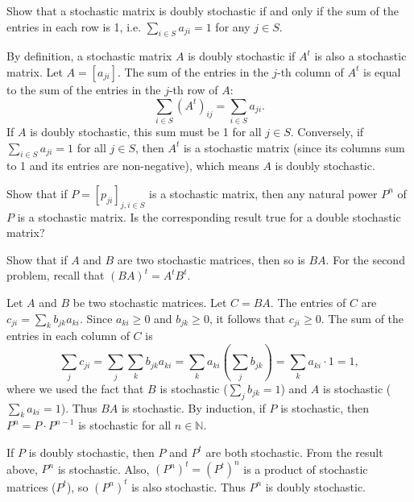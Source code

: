 \begin{Proposition}
\label{prp:double-stochastic}
Show that a stochastic matrix is doubly stochastic if and only if the sum of the entries in each row is 1, i.e. $\sum_{i\in S} a_{ji} = 1$ for any $j\in S$.
\end{Proposition}

\begin{Solution}
By definition, a stochastic matrix $A$ is doubly stochastic if $A^t$ is also a stochastic matrix. Let $A = [a_{ji}]$. The sum of the entries in the $j$-th column of $A^t$ is equal to the sum of the entries in the $j$-th row of $A$:
\[
\sum_{i \in S} (A^t)_{ij} = \sum_{i \in S} a_{ji}.
\]
If $A$ is doubly stochastic, this sum must be 1 for all $j \in S$. Conversely, if $\sum_{i \in S} a_{ji} = 1$ for all $j \in S$, then $A^t$ is a stochastic matrix (since its columns sum to 1 and its entries are non-negative), which means $A$ is doubly stochastic.
\end{Solution}

\begin{Exercise}
\label{exr:power-of-stochastic}
Show that if $P = [p_{ji}]_{j,i\in S}$ is a stochastic matrix, then any natural power $P^n$ of $P$ is a stochastic matrix. Is the corresponding result true for a double stochastic matrix?

\begin{hint}
Show that if $A$ and $B$ are two stochastic matrices, then so is $BA$. For the second problem, recall that $(BA)^t = A^t B^t$.
\end{hint}
\end{Exercise}

\begin{Solution}
Let $A$ and $B$ be two stochastic matrices. Let $C = BA$. The entries of $C$ are $c_{ji} = \sum_k b_{jk} a_{ki}$. Since $a_{ki} \geq 0$ and $b_{jk} \geq 0$, it follows that $c_{ji} \geq 0$. The sum of the entries in each column of $C$ is
\[
\sum_j c_{ji} = \sum_j \sum_k b_{jk} a_{ki} = \sum_k a_{ki} \left( \sum_j b_{jk} \right) = \sum_k a_{ki} \cdot 1 = 1,
\]
where we used the fact that $B$ is stochastic ($\sum_j b_{jk} = 1$) and $A$ is stochastic ($\sum_k a_{ki} = 1$). Thus $BA$ is stochastic. By induction, if $P$ is stochastic, then $P^n = P \cdot P^{n-1}$ is stochastic for all $n \in \mathbb{N}$.

If $P$ is doubly stochastic, then $P$ and $P^t$ are both stochastic. From the result above, $P^n$ is stochastic. Also, $(P^n)^t = (P^t)^n$ is a product of stochastic matrices ($P^t$), so $(P^n)^t$ is also stochastic. Thus $P^n$ is doubly stochastic.
\end{Solution}

